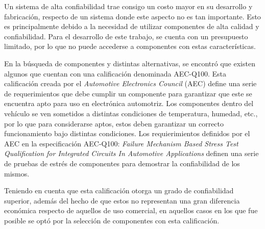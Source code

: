 Un sistema de alta confiabilidad trae consigo un costo mayor en su desarrollo y fabricación, respecto de un sistema donde este aspecto no es tan importante. Esto es principalmente debido a la necesidad de utilizar componentes de alta calidad y confiabilidad. Para el desarrollo de este trabajo, se cuenta con un presupuesto limitado, por lo que no puede accederse a componentes con estas características.

En la búsqueda de componentes y distintas alternativas, se encontró que existen algunos que cuentan con una calificación denominada AEC-Q100. Esta calificación creada por el \textit{Automotive Electronics Council} (AEC) define una serie de requerimientos que debe cumplir un componente para garantizar que este se encuentra apto para uso en electrónica automotriz. 
Los componentes dentro del vehículo se ven sometidos a distintas condiciones de temperatura, humedad, etc., por lo que para considerarse aptos, estos deben garantizar un correcto funcionamiento bajo distintas condiciones. Los requierimientos definidos por el AEC en la especificación AEC-Q100: \textit{Failure Mechanism Based Stress Test Qualification for Integrated Circuits In Automotive Applications} definen una serie de pruebas de estrés de componentes para demostrar la confiabilidad de los mismos.

Teniendo en cuenta que esta calificación otorga un grado de confiabilidad superior, además del hecho de que estos no representan una gran diferencia económica respecto de aquellos de uso comercial, en aquellos casos en los que fue posible se optó por la selección de componentes con esta calificación.













